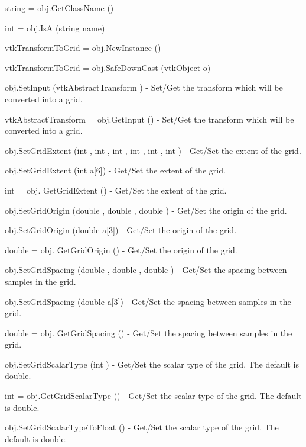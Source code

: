 \begin{DoxyItemize}
\item {\ttfamily string = obj.\-Get\-Class\-Name ()}  
\item {\ttfamily int = obj.\-Is\-A (string name)}  
\item {\ttfamily vtk\-Transform\-To\-Grid = obj.\-New\-Instance ()}  
\item {\ttfamily vtk\-Transform\-To\-Grid = obj.\-Safe\-Down\-Cast (vtk\-Object o)}  
\item {\ttfamily obj.\-Set\-Input (vtk\-Abstract\-Transform )} -\/ Set/\-Get the transform which will be converted into a grid.  
\item {\ttfamily vtk\-Abstract\-Transform = obj.\-Get\-Input ()} -\/ Set/\-Get the transform which will be converted into a grid.  
\item {\ttfamily obj.\-Set\-Grid\-Extent (int , int , int , int , int , int )} -\/ Get/\-Set the extent of the grid.  
\item {\ttfamily obj.\-Set\-Grid\-Extent (int a\mbox{[}6\mbox{]})} -\/ Get/\-Set the extent of the grid.  
\item {\ttfamily int = obj. Get\-Grid\-Extent ()} -\/ Get/\-Set the extent of the grid.  
\item {\ttfamily obj.\-Set\-Grid\-Origin (double , double , double )} -\/ Get/\-Set the origin of the grid.  
\item {\ttfamily obj.\-Set\-Grid\-Origin (double a\mbox{[}3\mbox{]})} -\/ Get/\-Set the origin of the grid.  
\item {\ttfamily double = obj. Get\-Grid\-Origin ()} -\/ Get/\-Set the origin of the grid.  
\item {\ttfamily obj.\-Set\-Grid\-Spacing (double , double , double )} -\/ Get/\-Set the spacing between samples in the grid.  
\item {\ttfamily obj.\-Set\-Grid\-Spacing (double a\mbox{[}3\mbox{]})} -\/ Get/\-Set the spacing between samples in the grid.  
\item {\ttfamily double = obj. Get\-Grid\-Spacing ()} -\/ Get/\-Set the spacing between samples in the grid.  
\item {\ttfamily obj.\-Set\-Grid\-Scalar\-Type (int )} -\/ Get/\-Set the scalar type of the grid. The default is double.  
\item {\ttfamily int = obj.\-Get\-Grid\-Scalar\-Type ()} -\/ Get/\-Set the scalar type of the grid. The default is double.  
\item {\ttfamily obj.\-Set\-Grid\-Scalar\-Type\-To\-Float ()} -\/ Get/\-Set the scalar type of the grid. The default is double.  

\end{DoxyItemize}
